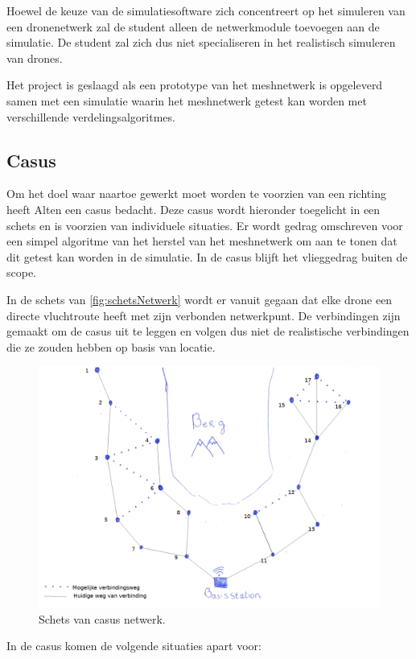 \documentclass[a4paper, 11pt, oneside]{report}
\begin{document}
Hoewel de keuze van de simulatiesoftware zich concentreert op het simuleren van een dronenetwerk zal de student alleen de netwerkmodule toevoegen aan de simulatie. 
De student zal zich dus niet specialiseren in het realistisch simuleren van drones.

Het project is geslaagd als een prototype van het meshnetwerk is opgeleverd samen met een simulatie waarin het meshnetwerk getest kan worden met verschillende verdelingsalgoritmes.

\subsection{Casus}\label{sec:casus}
Om het doel waar naartoe gewerkt moet worden te voorzien van een richting heeft Alten een casus bedacht.
Deze casus wordt hieronder toegelicht in een schets en is voorzien van individuele situaties.
Er wordt gedrag omschreven voor een simpel algoritme van het herstel van het meshnetwerk om aan te tonen dat dit getest kan worden in de simulatie.
In de casus blijft het vlieggedrag buiten de scope.


In de schets van \autoref{fig:schetsNetwerk} wordt er vanuit gegaan dat elke drone een directe vluchtroute heeft met zijn verbonden netwerkpunt.
De verbindingen zijn gemaakt  om de casus uit te leggen en volgen dus niet de realistische verbindingen die ze zouden hebben op basis van locatie.
\begin{figure}[H]
	\begin{center}\includegraphics[width=0.61\linewidth]{schetsNetwerk}\end{center}
	\caption{Schets van casus netwerk.}
	\label{fig:schetsNetwerk}
\end{figure}
In de casus komen de volgende situaties apart voor:
\end{document}
